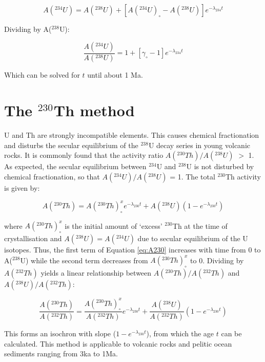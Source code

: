 \documentclass{book}
\begin{document}
\begin{equation}
A(^{234}U) = A(^{238}U) + \left[A(^{234}U)_\circ - A(^{238}U) \right] e^{-\lambda_{234}t} 
\label{eq:A234b}
\end{equation}

Dividing by A($^{238}$U):

\begin{equation}
\frac{A(^{234}U)}{A(^{238}U)} = 1 + [ \gamma_\circ - 1 ] e^{-\lambda_{234}t} 
\label{eq:A234A238}
\end{equation}

Which can be solved for $t$ until about 1 Ma.

\section{The $^{230}$Th method}
\label{sec:230}

U and Th are strongly incompatible elements. This causes chemical
fractionation and disturbs the secular equilibrium of the $^{238}$U
decay series in young volcanic rocks. It is commonly found that the
activity ratio $A(^{230}Th)/A(^{238}U)$ $>$ 1. As expected, the
secular equilibrium between $^{234}$U and $^{238}$U is not disturbed
by chemical fractionation, so that $A(^{234}U)/A(^{238}U)$ = 1. The
total $^{230}$Th activity is given by:

\begin{equation}
A(^{230}Th) = A(^{230}Th)_\circ^x e^{-\lambda_{230}t} + A(^{238}U)(1-e^{-\lambda_{230}t})
\label{eq:A230}
\end{equation}

where $A(^{230}Th)_\circ^x$ is the initial amount of `excess'
$^{230}$Th at the time of crystallisation and $A(^{238}U)=A(^{234}U)$
due to secular equilibrium of the U isotopes. Thus, the first term of
Equation \ref{eq:A230} increases with time from 0 to A($^{238}$U)
while the second term decreases from $A(^{230}Th)_\circ^x$ to
0. Dividing by $A(^{232}Th)$ yields a linear relationship between
$A(^{230}Th)/A(^{232}Th)$ and $A(^{238}U) / A(^{232}Th)$:

\begin{equation}
\frac{A(^{230}Th)}{A(^{232}Th)} = \frac{A(^{230}Th)_\circ^x}{A(^{232}Th)} e^{-\lambda_{230}t} + 
\frac{A(^{238}U)}{A(^{232}Th)}(1-e^{-\lambda_{230}t})
\label{eq:230232}
\end{equation}

This forms an isochron with slope ($1-e^{-\lambda_{230}t}$), from
which the age $t$ can be calculated. This method is applicable to
volcanic rocks and pelitic ocean sediments ranging from 3ka to 1Ma.
\end{document}
